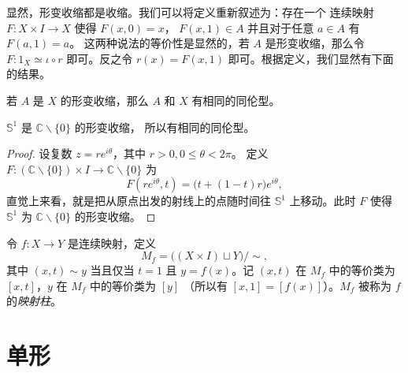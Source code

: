 \documentclass[fontset=none]{Notes}
\begin{document}
显然，形变收缩都是收缩。我们可以将定义重新叙述为：存在一个
连续映射 $F:X\times I\to X$ 使得 $F(x,0)=x$，
$F(x,1)\in A$ 并且对于任意 $a\in A$ 有 $F(a,1)=a$。
这两种说法的等价性是显然的，若 $A$ 是形变收缩，那么令
$F:1_X\simeq \iota\circ r$ 即可。反之令 $r(x)=F(x,1)$
即可。根据定义，我们显然有下面的结果。

\begin{theorem}
  若 $A$ 是 $X$ 的形变收缩，那么 $A$ 和 $X$ 有相同的同伦型。
\end{theorem}

\begin{corollary}
  $\mathbb{S}^1$ 是 $\mathbb{C}\smallsetminus\{0\}$ 的形变收缩，
  所以有相同的同伦型。
\end{corollary}
\begin{proof}
  设复数 $z=re^{i\theta}$，其中 $r>0,0\leq \theta<2\pi$。
  定义 $F:(\mathbb{C}\smallsetminus\{0\})\times I\to \mathbb{C}\smallsetminus\{0\}$
  为
  \[
    F(re^{i\theta},t)=\bigl(t+(1-t)r\bigr)e^{i\theta},
  \]
  直觉上来看，就是把从原点出发的射线上的点随时间往 $\mathbb{S}^1$
  上移动。此时 $F$ 使得 $\mathbb{S}^1$ 为 $\mathbb{C}\smallsetminus\{0\}$
  的形变收缩。
\end{proof}

\begin{definition}
  令 $f:X\to Y$ 是连续映射，定义
  \[
    M_f=\bigl((X\times I)\sqcup Y\bigr)/\sim,
  \]
  其中 $(x,t)\sim y$ 当且仅当 $t=1$ 且 $y=f(x)$。记 $(x,t)$ 在 $M_f$
  中的等价类为 $[x,t]$，$y$ 在 $M_f$ 中的等价类为 $[y]$
  （所以有 $[x,1]=[f(x)]$）。$M_f$ 被称为 $f$ 的\emph{映射柱}。
\end{definition}


\chapter{单形}
\end{document}
